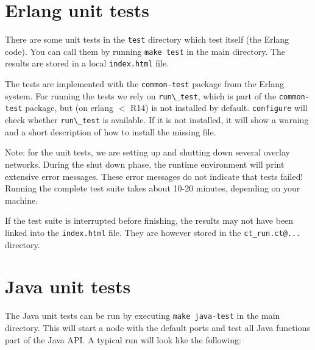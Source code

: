 \documentclass[a4paper]{scrreprt}
\newcommand{\code}[1]{\lstinline[basicstyle=\ttfamily]!#1!}
\begin{document}
\section{Erlang unit tests}
There are some unit tests in the \code{test} directory which test \scalaris{}
itself (the Erlang code). You can call them
by running \code{make test} in the main directory. The results are stored
in a local \code{index.html} file. 

The tests are implemented with the \code{common-test} package from the
Erlang system. For running the tests we rely on \code{run\_test},
which is part of the \code{common-test} package, but (on erlang $<$ R14) is not
installed by default. \code{configure} will check whether \code{run\_test} is
available. If it is not installed, it will show a warning and a short
description of how to install the missing file.

Note: for the unit tests, we are setting up and shutting down several
overlay networks. During the shut down phase, the runtime environment
will print extensive error messages. These error messages do not
indicate that tests failed! Running the complete test suite takes
about 10-20 minutes, depending on your machine.

If the test suite is interrupted before finishing, the results may not have
been linked into the \code{index.html} file. They are however stored in the
\code{ct_run.ct@...} directory.

\section{Java unit tests}
The Java unit tests can be run by executing \code{make java-test} in the main
directory. This will start a \scalaris{} node with the default ports and test
all Java functions part of the Java API. A typical run will look like the
following:
\end{document}
